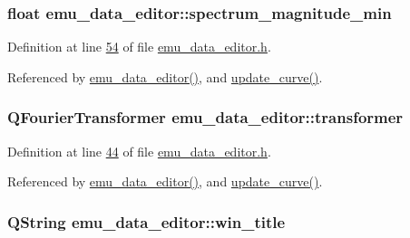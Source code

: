 \hypertarget{a00004_afb692cc49c350d4bf120ca1e3dd61e93}{
\subsubsection[{spectrum\+\_\+magnitude\+\_\+min}]{\setlength{\rightskip}{0pt plus 5cm}float emu\+\_\+data\+\_\+editor\+::spectrum\+\_\+magnitude\+\_\+min}}\label{a00004_afb692cc49c350d4bf120ca1e3dd61e93}


Definition at line \hyperlink{a00036_source_l00054}{54} of file \hyperlink{a00036_source}{emu\+\_\+data\+\_\+editor.\+h}.



Referenced by \hyperlink{a00035_source_l00012}{emu\+\_\+data\+\_\+editor()}, and \hyperlink{a00035_source_l00284}{update\+\_\+curve()}.

\hypertarget{a00004_a0d6e12337ef942452edea37827e58cd4}{
\subsubsection[{transformer}]{\setlength{\rightskip}{0pt plus 5cm}Q\+Fourier\+Transformer emu\+\_\+data\+\_\+editor\+::transformer}}\label{a00004_a0d6e12337ef942452edea37827e58cd4}


Definition at line \hyperlink{a00036_source_l00044}{44} of file \hyperlink{a00036_source}{emu\+\_\+data\+\_\+editor.\+h}.



Referenced by \hyperlink{a00035_source_l00012}{emu\+\_\+data\+\_\+editor()}, and \hyperlink{a00035_source_l00284}{update\+\_\+curve()}.

\hypertarget{a00004_a2abdde44f37258778dcc571e8cc7ed1a}{
\subsubsection[{win\+\_\+title}]{\setlength{\rightskip}{0pt plus 5cm}Q\+String emu\+\_\+data\+\_\+editor\+::win\+\_\+title}}\label{a00004_a2abdde44f37258778dcc571e8cc7ed1a}


